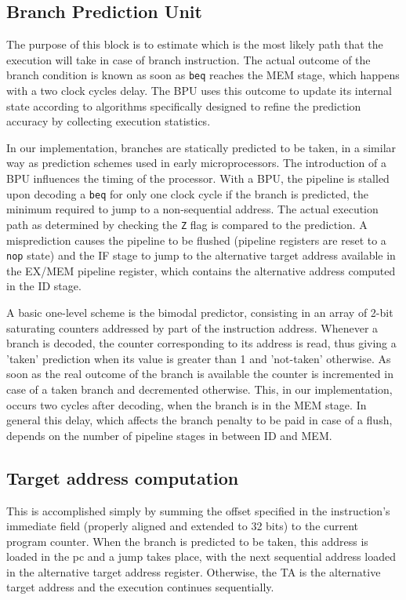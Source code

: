 \subsection{Branch Prediction Unit} The purpose of this block is to estimate which is the most likely path that the execution will take in case of branch instruction. The actual outcome of the branch condition is known as soon as \texttt{beq} reaches the MEM stage, which happens with a two clock cycles delay. The BPU uses this outcome to update its internal state according to algorithms specifically designed to refine the prediction accuracy by collecting execution statistics.

In our implementation, branches are statically predicted to be taken, in a similar way as prediction schemes used in early microprocessors. The introduction of a BPU influences the timing of the processor. With a BPU, the pipeline is stalled upon decoding a \texttt{beq} for only one clock cycle if the branch is predicted, the minimum required to jump to a non-sequential address. The actual execution path as determined by checking the \texttt{Z} flag is compared to the prediction. A misprediction causes the pipeline to be flushed (pipeline registers are reset to a \texttt{nop} state) and the IF stage to jump to the alternative target address available in the EX/MEM pipeline register, which contains the alternative address computed in the ID stage.

A basic one-level scheme is the bimodal predictor, consisting in an array of 2-bit saturating counters addressed by part of the instruction address. Whenever a branch is decoded, the counter corresponding to its address is read, thus giving a 'taken' prediction when its value is greater than 1 and 'not-taken' otherwise. As soon as the real outcome of the branch is available the counter is incremented in case of a taken branch and decremented otherwise. This, in our implementation, occurs two cycles after decoding, when the branch is in the MEM stage. In general this delay, which affects the branch penalty to be paid in case of a flush, depends on the number of pipeline stages in between ID and MEM.


\subsection{Target address computation} This is accomplished simply by summing the offset specified in the instruction's immediate field (properly aligned and extended to 32 bits) to the current program counter. When the branch is predicted to be taken, this address is loaded in the pc and a jump takes place, with the next sequential address loaded in the alternative target address register. Otherwise, the TA is the alternative target address and the execution continues sequentially.

